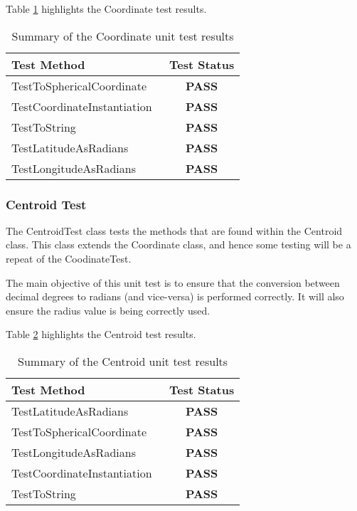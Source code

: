 Table \ref{tab:coordinate_test} highlights the Coordinate test results.

\begin{table}[h]
  \centering
  \begin{tabular}{|l|c|}
    \hline
    {\bfseries Test Method}     & {\bfseries Test Status} \\ 
    \hline
    TestToSphericalCoordinate   & {\bfseries \color{OliveGreen} PASS}   \\
    TestCoordinateInstantiation & {\bfseries \color{OliveGreen} PASS}   \\ 
    TestToString                & {\bfseries \color{OliveGreen} PASS}   \\
    TestLatitudeAsRadians       & {\bfseries \color{OliveGreen} PASS}   \\
    TestLongitudeAsRadians      & {\bfseries \color{OliveGreen} PASS}   \\
    \hline
  \end{tabular}
  \caption[Summary of the Coordinate unit test results]
          {Summary of the Coordinate unit test results}
  \label{tab:coordinate_test}
\end{table}


\subsubsection{Centroid Test}

The {\ttfamily CentroidTest} class tests the methods that are found 
within the Centroid class. This class extends the Coordinate class, and hence 
some testing will be a repeat of the {\ttfamily CoodinateTest}.

The main objective of this unit test is to ensure that the conversion between 
decimal degrees to radians (and vice-versa) is performed correctly. It will 
also ensure the radius value is being correctly used.

Table \ref{tab:centroid_test} highlights the Centroid test results.

\begin{table}[h]
  \centering
  \begin{tabular}{|l|c|}
    \hline
    {\bfseries Test Method}     & {\bfseries Test Status} \\ 
    \hline
    TestLatitudeAsRadians       & {\bfseries \color{OliveGreen} PASS} \\ 
    TestToSphericalCoordinate   & {\bfseries \color{OliveGreen} PASS} \\ 
    TestLongitudeAsRadians      & {\bfseries \color{OliveGreen} PASS} \\ 
    TestCoordinateInstantiation & {\bfseries \color{OliveGreen} PASS} \\ 
    TestToString                & {\bfseries \color{OliveGreen} PASS} \\
    \hline
  \end{tabular}
  \caption[Summary of the Centroid unit test results]
          {Summary of the Centroid unit test results}
  \label{tab:centroid_test}
\end{table}



